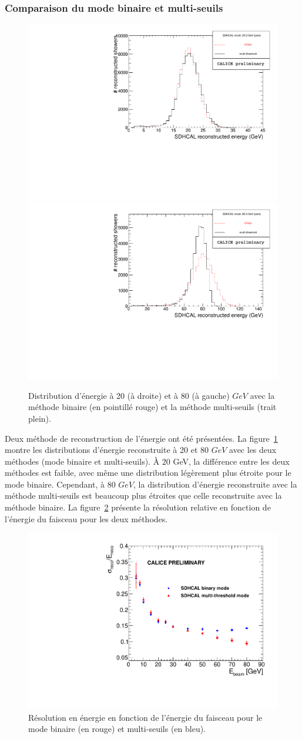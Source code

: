 \subsubsection{Comparaison du mode binaire et multi-seuils}
\begin{figure}[!h]
  \begin{center}
    \includegraphics[width=.43\textwidth]{SDHCAL/figs/Pi20GeV_SDHCAL_2modes_overlay.pdf}
    \includegraphics[width=.43\textwidth]{SDHCAL/figs/Pi80GeV_SDHCAL_2modes_overlay.pdf}
    \caption{Distribution d'énergie à 20 (à droite) et à 80 (à gauche) $GeV$ avec la méthode binaire (en pointillé rouge) et la méthode multi-seuils (trait plein).}
    \label{fig:multi_vs_binary_dist}
  \end{center}
\end{figure}
Deux méthode de reconstruction de l'énergie ont été présentées. La figure~\ref{fig:multi_vs_binary_dist} montre les distributions d'énergie reconstruite à 20 et 80 $GeV$ avec les deux méthodes (mode binaire et multi-seuils). À $20$ GeV, la différence entre les deux méthodes est faible, avec même une distribution légèrement plus étroite pour le mode binaire. Cependant, à 80 $GeV$, la distribution d'énergie reconstruite avec la méthode multi-seuils est beaucoup plus étroites que celle reconstruite avec la méthode binaire. La figure~\ref{fig:multi_vs_binary_res} présente la résolution relative en fonction de l'énergie du faisceau pour les deux méthodes.
\begin{figure}[!h]
  \begin{center}
    \includegraphics[width=.55\textwidth]{SDHCAL/figs/RESOLUTION.pdf}
    \caption{Résolution en énergie en fonction de l’énergie du faisceau pour le mode binaire (en rouge) et multi-seuils (en bleu).}
    \label{fig:multi_vs_binary_res}
  \end{center}
\end{figure}
